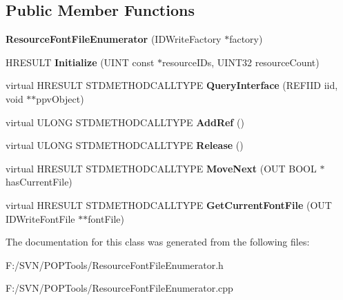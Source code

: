 \subsection*{Public Member Functions}
\begin{DoxyCompactItemize}
\item 
\hypertarget{class_resource_font_file_enumerator_a604ee80befe30fe9f4159ae9c5ecdeea}{{\bfseries Resource\-Font\-File\-Enumerator} (I\-D\-Write\-Factory $\ast$factory)}\label{class_resource_font_file_enumerator_a604ee80befe30fe9f4159ae9c5ecdeea}

\item 
\hypertarget{class_resource_font_file_enumerator_a809072885f8c5ecc23764d57e3b7f0b5}{H\-R\-E\-S\-U\-L\-T {\bfseries Initialize} (U\-I\-N\-T const $\ast$resource\-I\-Ds, U\-I\-N\-T32 resource\-Count)}\label{class_resource_font_file_enumerator_a809072885f8c5ecc23764d57e3b7f0b5}

\item 
\hypertarget{class_resource_font_file_enumerator_a121e0188c536d7324cce24cf1afa0f82}{virtual H\-R\-E\-S\-U\-L\-T S\-T\-D\-M\-E\-T\-H\-O\-D\-C\-A\-L\-L\-T\-Y\-P\-E {\bfseries Query\-Interface} (R\-E\-F\-I\-I\-D iid, void $\ast$$\ast$ppv\-Object)}\label{class_resource_font_file_enumerator_a121e0188c536d7324cce24cf1afa0f82}

\item 
\hypertarget{class_resource_font_file_enumerator_a9410f1c58f02f2d82d549bfe68cf5002}{virtual U\-L\-O\-N\-G S\-T\-D\-M\-E\-T\-H\-O\-D\-C\-A\-L\-L\-T\-Y\-P\-E {\bfseries Add\-Ref} ()}\label{class_resource_font_file_enumerator_a9410f1c58f02f2d82d549bfe68cf5002}

\item 
\hypertarget{class_resource_font_file_enumerator_a67dffdfda8092e36425a9445cc189dfc}{virtual U\-L\-O\-N\-G S\-T\-D\-M\-E\-T\-H\-O\-D\-C\-A\-L\-L\-T\-Y\-P\-E {\bfseries Release} ()}\label{class_resource_font_file_enumerator_a67dffdfda8092e36425a9445cc189dfc}

\item 
\hypertarget{class_resource_font_file_enumerator_ab6b9d3c7e8687186118d238c805ab0f0}{virtual H\-R\-E\-S\-U\-L\-T S\-T\-D\-M\-E\-T\-H\-O\-D\-C\-A\-L\-L\-T\-Y\-P\-E {\bfseries Move\-Next} (O\-U\-T B\-O\-O\-L $\ast$has\-Current\-File)}\label{class_resource_font_file_enumerator_ab6b9d3c7e8687186118d238c805ab0f0}

\item 
\hypertarget{class_resource_font_file_enumerator_a8c7d11daa110300498f7d999b76f2cf2}{virtual H\-R\-E\-S\-U\-L\-T S\-T\-D\-M\-E\-T\-H\-O\-D\-C\-A\-L\-L\-T\-Y\-P\-E {\bfseries Get\-Current\-Font\-File} (O\-U\-T I\-D\-Write\-Font\-File $\ast$$\ast$font\-File)}\label{class_resource_font_file_enumerator_a8c7d11daa110300498f7d999b76f2cf2}

\end{DoxyCompactItemize}


The documentation for this class was generated from the following files\-:\begin{DoxyCompactItemize}
\item 
F\-:/\-S\-V\-N/\-P\-O\-P\-Tools/Resource\-Font\-File\-Enumerator.\-h\item 
F\-:/\-S\-V\-N/\-P\-O\-P\-Tools/Resource\-Font\-File\-Enumerator.\-cpp\end{DoxyCompactItemize}
